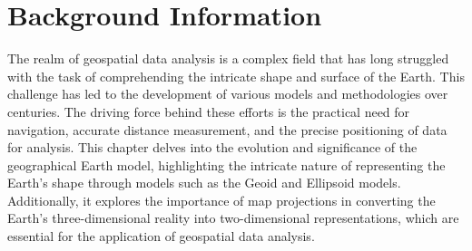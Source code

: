 
\clearpage
\cleardoublepage

\chapter{Background Information}
\label{chap:background_information}
The realm of geospatial data analysis is a complex field that has long struggled with the task of comprehending the intricate shape and surface of the Earth.
This challenge has led to the development of various models and methodologies over centuries. The driving force behind these efforts is the practical need for navigation,
accurate distance measurement, and the precise positioning of data for analysis. This chapter delves into the evolution and significance of the geographical Earth model,
highlighting the intricate nature of representing the Earth's shape through models such as the Geoid and Ellipsoid models. Additionally, it explores the importance of
map projections in converting the Earth's three-dimensional reality into two-dimensional representations, which are essential for the application of
geospatial data analysis.



\clearpage
